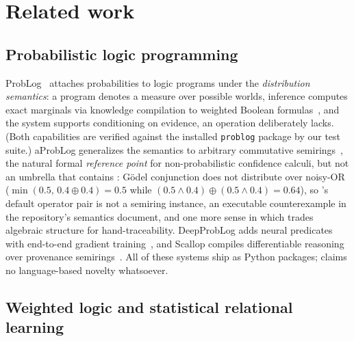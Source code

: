 \section{Related work}\label{sec:related}

\subsection{Probabilistic logic programming}

ProbLog~\cite{deraedt2007} attaches probabilities to logic programs
under the \emph{distribution semantics}: a program denotes a measure over
possible worlds, inference computes exact marginals via knowledge
compilation to weighted Boolean formulas~\cite{fierens2015}, and the
system supports conditioning on evidence, an operation \pla{}
deliberately lacks. (Both capabilities are verified against the
installed \texttt{problog} package by our test suite.) aProbLog
generalizes the semantics to arbitrary commutative
semirings~\cite{kimmig2011}, the natural formal \emph{reference
point} for non-probabilistic confidence calculi, but not an umbrella
that contains \pla{}: G\"odel conjunction does not distribute over
noisy-OR ($\min(0.5,\, 0.4 \oplus 0.4) = 0.5$ while
$(0.5 \wedge 0.4) \oplus (0.5 \wedge 0.4) = 0.64$), so \pla{}'s default
operator pair is not a semiring instance, an executable
counterexample in the repository's semantics document, and one more
sense in which \pla{} trades algebraic structure for hand-traceability. DeepProbLog adds
neural predicates with end-to-end gradient training~\cite{manhaeve2018},
and Scallop compiles differentiable reasoning over provenance
semirings~\cite{li2023}. All of these systems ship as Python packages;
\pla{} claims no language-based novelty whatsoever.

\subsection{Weighted logic and statistical relational learning}

